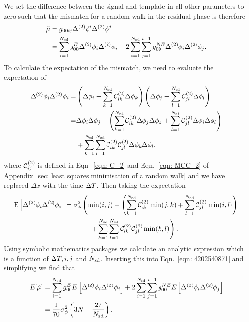 We set the difference between the signal and template in all other parameters
to zero such that the mismatch for a random walk in the residual phase is
therefore
\begin{align}
\tilde{\mu} & = g_{0 0 i j} \Delta^{(2)}\phi^{i}\Delta^{(2)}\phi^{j} \\
& = \sum_{i=1}^{N_{\textrm{sd}}}g_{00}^{E} \Delta^{(2)}\phi_{i}\Delta^{(2)}\phi_{i}
+ 2 \sum_{i=1}^{N_{\textrm{sd}}}\sum_{j=1}^{i-1}g_{00}^{NE}\Delta^{(2)}\phi_{i}\Delta^{(2)}\phi_{j}.
\label{eqn: 4202540871}
\end{align}
To calculate the expectation of the mismatch, we need to evaluate the
expectation of
\begin{align}
\Delta^{(2)}\phi_{i}\Delta^{(2)}\phi_{i} = & \left(\Delta\phi_{i}
- \sum_{k=1}^{N_{\textrm{sd}}}\mathcal{C}^{(2)}_{ik}\Delta\phi_{k}\right)
 \left(\Delta\phi_{j} - \sum_{l=1}^{N_{\textrm{sd}}}\mathcal{C}^{(2)}_{jl}\Delta\phi_{l}\right) \\
= & \Delta\phi_{i}\Delta\phi_{j} -
\left(\sum_{k=1}^{N_{\textrm{sd}}}\mathcal{C}^{(2)}_{ik} \Delta\phi_{j}\Delta\phi_{k}
+ \sum_{l=1}^{N_{\textrm{sd}}}\mathcal{C}^{(2)}_{jl}\Delta\phi_{i}\Delta\phi_{l}\right) \nonumber \\
& +
\sum_{k=1}^{N_{\textrm{sd}}}\sum_{l=1}^{N_{\textrm{sd}}}\mathcal{C}^{(2)}_{ik}\mathcal{C}^{(2)}_{jl} \Delta\phi_{k}\Delta\phi_{l},
\end{align}
where $\mathcal{C}^{(2)}_{ij}$ is defined in Eqn.~\ref{eqn: C_2} and Eqn.~\ref{eqn:  MCC_2}
of Appendix~\ref{sec: least squares minimisation of a random walk} and we have
replaced $\Delta x$ with the time $\Delta T$. Then taking the expectation
\begin{align}
\E{\Delta^{(2)}\phi_{i}\Delta^{(2)}\phi_{i}} & =
\sigma^{2}_{\phi} \left(\min(i, j) - \left(\s{k=1}{\Nsd}\CT_{ik} \min(j, k)
+ \s{l=1}{\Nsd}\CT_{jl}\min(i, l) \right)\right. \notag \\
& \hspace{13mm} \left. + \s{k=1}{\Nsd}\s{l=1}{\Nsd}\CT_{ik}\CT_{jl}\min(k, l)\right).
\label{eqn: expected mismatch dP0idP0j_k2}
\end{align}
Using symbolic mathematics packages we
calculate an analytic expression which is a function of $\Delta T, i, j$ and $N_{\textrm{sd}}$.
Inserting this into Eqn.~\eqref{eqn: 4202540871} and simplifying we find that
\begin{align}
E[\tilde{\mu}]  & = \sum_{i=1}^{N_{\textrm{sd}}}g_{00}^{E} E\left[\Delta^{(2)}\phi_{i}\Delta^{(2)}\phi_{i}\right]
+ 2 \sum_{i=1}^{N_{\textrm{sd}}}\sum_{j=1}^{i-1}g_{00}^{NE}E\left[\Delta^{(2)}\phi_{i}\Delta^{(2)}\phi_{j}\right]  \\
& = \frac{1}{70}\sigma_{\phi}^{2}\left(3N - \frac{27}{N_{\textrm{sd}}}\right).
\label{eqn: Expected mismatch RW in phase k2}
\end{align}
